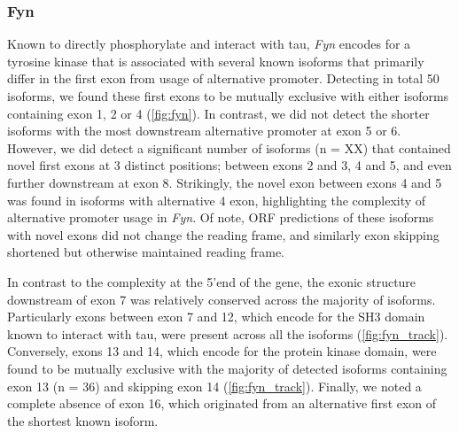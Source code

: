\subsubsection{Fyn}
Known to directly phosphorylate and interact with tau, \textit{Fyn} encodes for a tyrosine kinase that is associated with several known isoforms that primarily differ in the first exon from usage of alternative promoter. Detecting in total 50 isoforms, we found these first exons to be mutually exclusive with either isoforms containing exon 1, 2 or 4 (\cref{fig:fyn}). In contrast, we did not detect the shorter isoforms with the most downstream alternative promoter at exon 5 or 6. However, we did detect a significant number of isoforms (n = XX) that contained novel first exons at 3 distinct positions; between exons 2 and 3, 4 and 5, and even further downstream at exon 8. Strikingly, the novel exon between exons 4 and 5 was found in isoforms with alternative 4 exon, highlighting the complexity of alternative promoter usage in \textit{Fyn}. Of note, ORF predictions of these isoforms with novel exons did not change the reading frame, and similarly exon skipping shortened but otherwise maintained reading frame.  

In contrast to the complexity at the 5'end of the gene, the exonic structure downstream of exon 7 was relatively conserved across the majority of isoforms. Particularly exons between exon 7 and 12, which encode for the SH3 domain known to interact with tau, were present across all the isoforms (\cref{fig:fyn_track}). Conversely, exons 13 and 14,  which encode for the protein kinase domain, were found to be mutually exclusive with the majority of detected isoforms containing exon 13 (n = 36) and skipping exon 14 (\cref{fig:fyn_track}). Finally, we noted a complete absence of exon 16, which originated from an alternative first exon of the shortest known isoform. 

